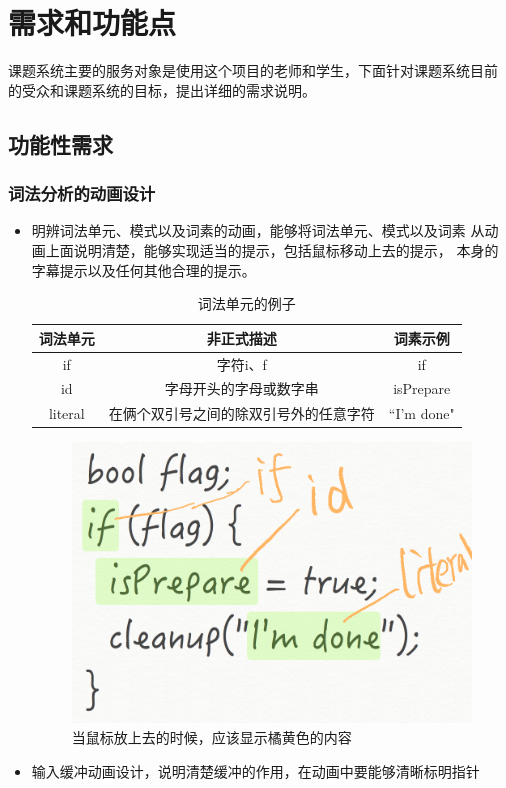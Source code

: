 \section{需求和功能点}
课题系统主要的服务对象是使用这个项目的老师和学生，下面针对课题系统目前
的受众和课题系统的目标，提出详细的需求说明。

\subsection{功能性需求}
\subsubsection{词法分析的动画设计}
\begin{itemize}
\item 明辨词法单元、模式以及词素的动画，能够将词法单元、模式以及词素
  从动画上面说明清楚，能够实现适当的提示，包括鼠标移动上去的提示，
  本身的字幕提示以及任何其他合理的提示。
  \begin{table}[!hbp]
  	\centering
  	\begin{tabular}{c|c|c}
  		\hline
  		词法单元 & 非正式描述 & 词素示例\\
  		\hline
  		if & 字符i、f & if\\
  		\hline
  		id & 字母开头的字母或数字串 & isPrepare\\
  		\hline
  		literal & 在俩个双引号之间的除双引号外的任意字符 & ``I'm done"\\
		\hline
  	\end{tabular}
  	\caption{词法单元的例子}
  \end{table}
  \begin{figure}[!htb]
  	\centering
  	\includegraphics[width=0.7\linewidth]{img/lexical.png}
  	\caption{当鼠标放上去的时候，应该显示橘黄色的内容}
  	\label{fig:lexical.png}
  \end{figure}
\item 输入缓冲动画设计，说明清楚缓冲的作用，在动画中要能够清晰标明指针

\end{itemize}
